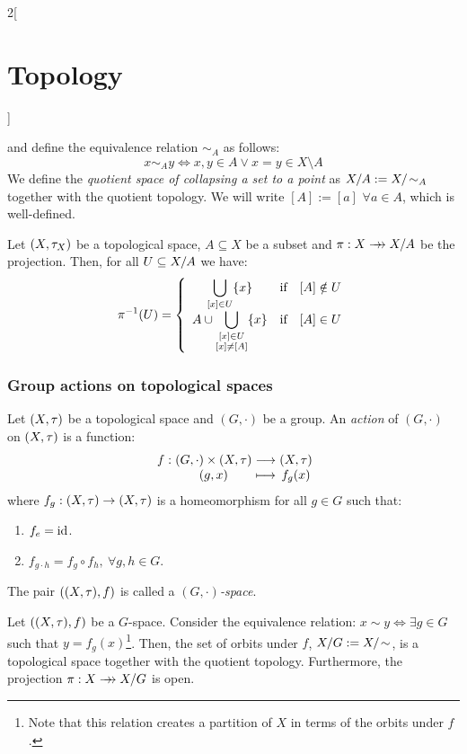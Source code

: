\documentclass[../../../main.tex]{subfiles}
\begin{document}
\begin{multicols}{2}[\section{Topology}]
\begin{definition}
    and define the equivalence relation $\sim_A$ as follows: $$x\sim_A y\iff x,y\in A\lor x=y\in X\setminus A$$
    We define the \emph{quotient space of collapsing a set to a point} as $\quot{X}{A}:=\quot{X}{\!\sim_A}$ together with the quotient topology. We will write $[A]:=[a]$ $\forall a\in A$, which is well-defined.
  \end{definition}
  \begin{proposition}
    Let $(X,\tau_X)$ be a topological space, $A\subseteq X$ be a subset and $\pi:X\rrightarrow\quot{X}{A}$ be the projection. Then, for all $U\subseteq\quot{X}{A}$ we have:
    $$
      \pi^{-1}(U)=\left\{\begin{array}{ccc}
        \displaystyle\bigcup_{[x]\in U}\{x\} & \text{if} & [A]\notin U \\
        \displaystyle A\cup \bigcup_{
          \begin{subarray}{c}
            [x]\in U \\
            [x]\ne [A]
          \end{subarray}
        }\{x\}                               & \text{if} & [A]\in U
      \end{array}\right.
    $$
  \end{proposition}
  \subsubsection{Group actions on topological spaces}
  \begin{definition}
    Let $(X,\tau)$ be a topological space and $(G,\cdot)$ be a group. An \emph{action} of $(G,\cdot)$ on $(X,\tau)$ is a function:
    $$\function{f}{(G,\cdot)\times(X,\topo)}{(X,\topo)}{(g,x)}{f_g(x)}$$ where $f_g:(X,\tau)\rightarrow(X,\tau)$ is a homeomorphism for all $g\in G$ such that:
    \begin{enumerate}
      \item $f_e=\mathrm{id}$.
      \item $f_{g\cdot h}=f_g\circ f_h,\ \forall g,h\in G$.
    \end{enumerate}
    The pair $((X,\tau),f)$ is called a \emph{$(G,\cdot)$-space}.
  \end{definition}
  \begin{proposition}
    Let $((X,\tau),f)$ be a $G$-space. Consider the equivalence relation: $x\sim y\iff\exists g\in G$ such that $y=f_g(x)$\footnote{Note that this relation creates a partition of $X$ in terms of the orbits under $f$.}. Then, the set of orbits under $f$, $\quot{X}{G}:=\quot{X}{\!\sim}$, is a topological space together with the quotient topology. Furthermore, the projection $\pi:X\rrightarrow\quot{X}{G}$ is open.
  \end{proposition}

\end{multicols}
\end{document}
